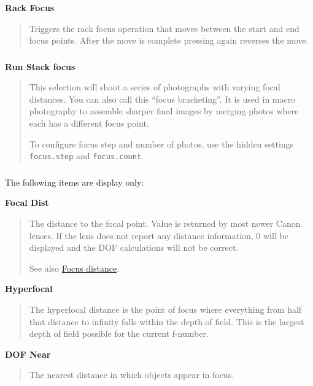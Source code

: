 \documentclass[a4paper,english]{article}
\begin{document}
\textbf{Rack Focus}
%
\begin{quote}

Triggers the rack focus operation that moves between the start and end focus points. After the move is complete pressing again reverses the move.

\end{quote}
\vspace{-10mm}\subsubsection*{}\label{focus-stacking}
\textbf{Run Stack focus}
%
\begin{quote}

This selection will shoot a series of photographs with varying focal distances. You can also call this ``focus bracketing''.
It is used in macro photography to assemble sharper final images by merging photos where each has a different focus point.

To configure focus step and number of photos, use the hidden settings \texttt{focus.step} and \texttt{focus.count}.

\end{quote}
\vspace{-10mm}\subsubsection*{}\label{focus-and-dof-info}
The following items are display only:

\textbf{Focal Dist}
%
\begin{quote}

The distance to the focal point. Value is returned by most newer Canon lenses. If the lens does not report any distance information, 0 will be displayed and the DOF calculations will not be correct.

See also \href{http://magiclantern.wikia.com/wiki/Focus\%20distance}{Focus distance}.

\end{quote}

\textbf{Hyperfocal}
%
\begin{quote}

The hyperfocal distance is the point of focus where everything from half that distance to infinity falls within the depth of field. This is the largest depth of field possible for the current f-number.

\end{quote}

\textbf{DOF Near}
%
\begin{quote}

The nearest distance in which objects appear in focus.

\end{quote}
\end{document}
